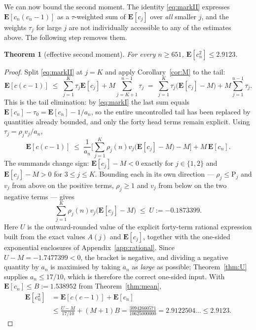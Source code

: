\documentclass[11pt,a4paper]{amsart}
\theoremstyle{plain}
\newtheorem{theorem}{Theorem}[section]
\theoremstyle{definition}
\newcommand{\EX}{\mathbf{E}}
\begin{document}
We can now bound the second moment. The identity \eqref{eq:markII} expresses
$\EX[c_n(c_n-1)]$ as a $\tau$-weighted sum of $\EX[c_j]$ over \emph{all} smaller
$j$, and the weights $\tau_j$ for large $j$ are not individually accessible to
any of the estimates above. The following step removes them.

\begin{theorem}[effective second moment]\label{thm:secondmoment}
For every $n \ge 651$, $\EX[c_n^2] \le 2.9123$.
\end{theorem}

\begin{proof}
Split \eqref{eq:markII} at $j=K$ and apply Corollary~\ref{cor:M} to the tail:
\[
  \EX[c(c-1)]
  \;\le\; \sum_{j=1}^{K}\tau_j\EX[c_j] + M\!\!\sum_{j=K+1}^{n-1}\!\!\tau_j
  \;=\; \sum_{j=1}^{K}\tau_j\big(\EX[c_j]-M\big)
        + M\sum_{j=1}^{n-1}\tau_j .
\]
This is the tail elimination: by \eqref{eq:markI} the last sum equals
$\EX[c_n]-\tau_0 = \EX[c_n]-1/a_n$, so the entire uncontrolled tail has been
replaced by quantities already bounded, and only the forty head terms remain
explicit. Using $\tau_j = \rho_j v_j/a_n$,
\[
  \EX[c(c-1)]
  \;\le\; \frac{1}{a_n}\Big[\sum_{j=1}^{K}\rho_j(n)v_j\big(\EX[c_j]-M\big)-M\Big]
          + M\,\EX[c_n] .
\]
The summands change sign: $\EX[c_j]-M<0$ exactly for $j \in \{1,2\}$ and
$\EX[c_j]-M>0$ for $3 \le j \le K$. Bounding each in its own direction ---
$\rho_j \le \mathrm{P}_j$ and $v_j$ from above on the positive terms,
$\rho_j \ge 1$ and $v_j$ from below on the two negative terms --- gives
\[
  \sum_{j=1}^{K}\rho_j(n)v_j\big(\EX[c_j]-M\big) \;\le\; U := -0.1873399 .
\]
Here $U$ is the outward-rounded value of the explicit forty-term rational
expression built from the exact values $A(j)$ and $\EX[c_j]$, together with the
one-sided exponential enclosures of Appendix~\ref{app:rational}.
Since $U-M = -1.7477399 < 0$, the bracket is negative, and dividing a negative
quantity by $a_n$ is maximised by taking $a_n$ as \emph{large} as possible;
Theorem~\ref{thm:U} supplies $a_n \le 17/10$, which is therefore the correct
one-sided input. With $\EX[c_n]\le B := 1.538952$ from Theorem~\ref{thm:mean},
\[
\begin{aligned}
  \EX[c_n^2]
  &= \EX[c(c-1)]+\EX[c_n]\\
  &\le \frac{U-M}{17/10}+(M+1)B
   = \frac{30942660571}{10625000000}
   = 2.9122504\ldots \le 2.9123 .
\end{aligned}
\]
\end{proof}
\end{document}
